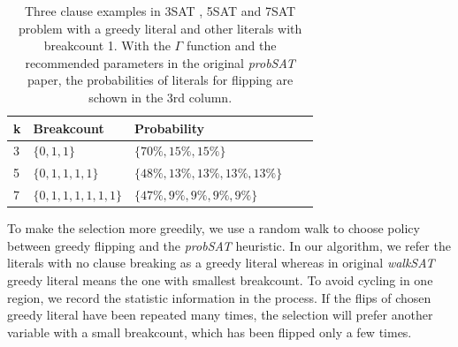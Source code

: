 \documentclass[12pt,a4paper,twoside]{scrartcl}
\numberwithin{equation}{section}
\begin{document}
\begin{table}[h!]
\label{parma}
\begin{center}
\begin{tabular}{|l|l|l|l|p{3cm}|}\hline 
k&  Breakcount &          Probability  \\ \hline     
3&  $\{0, 1, 1\}$ & $\{70\%, 15\%, 15\%\}$   \\ \hline         
5 &  $\{0, 1, 1, 1, 1\}$   & $\{  48\%, 13\%, 13\%, 13\%, 13\%\}$\\ \hline
7 & $\{0, 1, 1, 1, 1, 1, 1\}$&    $\{  47\%, 9\%, 9\%, 9\%, 9\%\}$\\ \hline
\end{tabular}
\caption{Three clause examples in 3SAT , 5SAT and 7SAT problem with a greedy literal and other literals with breakcount 1. With the  $\Gamma$  function and the recommended parameters in the original \emph{probSAT} paper, the probabilities of literals for flipping are schown in the 3rd column.}
\end{center}
\end{table}  
To make the selection more greedily, we use a random walk to choose policy between greedy flipping and the \emph{probSAT} heuristic.  In our algorithm, we refer the literals with no clause breaking as a greedy literal whereas in original \emph{walkSAT} greedy literal means the one with smallest breakcount. To avoid cycling in one region, we record the statistic information in the process.  If the flips of chosen greedy literal have been repeated many times, the selection will prefer another variable with a small breakcount, which has been flipped only a few times.  
\end{document}
